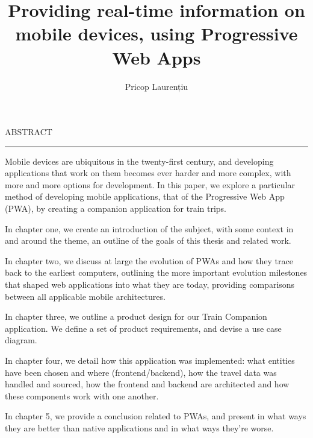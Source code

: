 \documentclass[12pt]{report}
\begin{document}
\title{Providing real-time information on mobile devices, using Progressive Web Apps}
\author{Pricop Laurențiu}

\maketitle

\newpage
\thispagestyle{empty}
\mbox{}
\newpage
{}

\cleardoublepage
ABSTRACT
\vspace{0.5cm}
\hrule
\vspace{0.5cm}

Mobile devices are ubiquitous in the twenty-first century, and developing applications that work on them becomes ever harder and more complex, with more and more options for development. In this paper, we explore a particular method of developing mobile applications, that of the Progressive Web App (PWA), by creating a companion application for train trips.

In chapter one, we create an introduction of the subject, with some context in and around the theme, an outline of the goals of this thesis and related work.

In chapter two, we discuss at large the evolution of PWAs and how they trace back to the earliest computers, outlining the more important evolution milestones that shaped web applications into what they are today, providing comparisons between all applicable mobile architectures.

In chapter three, we outline a product design for our Train Companion application. We define a set of product requirements, and devise a use case diagram.

In chapter four, we detail how this application was implemented: what entities have been chosen and where (frontend/backend), how the travel data was handled and sourced, how the frontend and backend are architected and how these components work with one another.

In chapter 5, we provide a conclusion related to PWAs, and present in what ways they are better than native applications and in what ways they're worse.

\tableofcontents


\newpage
{}









% 

\end{document}
